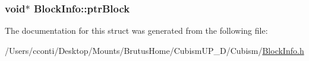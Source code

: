 \subsubsection[{ptr\+Block}]{\setlength{\rightskip}{0pt plus 5cm}void$\ast$ Block\+Info\+::ptr\+Block}\label{struct_block_info_af3655416c17becfb24a9f475a7b97d23}


The documentation for this struct was generated from the following file\+:\begin{DoxyCompactItemize}
\item 
/\+Users/cconti/\+Desktop/\+Mounts/\+Brutus\+Home/\+Cubism\+U\+P\+\_\+D/\+Cubism/\hyperlink{_block_info_8h}{Block\+Info.\+h}\end{DoxyCompactItemize}
